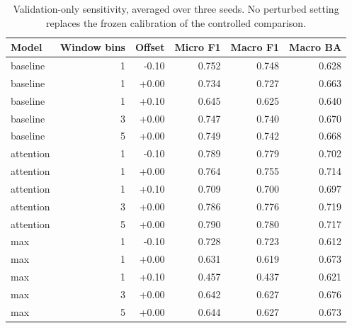 \begin{table}[H]\centering\small
\caption{Validation-only sensitivity, averaged over three seeds. No perturbed setting replaces the frozen calibration of the controlled comparison.}
\begin{tabular}{lrrrrr}\toprule
Model & Window bins & Offset & Micro F1 & Macro F1 & Macro BA \\\midrule
baseline & 1 & -0.10 & 0.752 & 0.748 & 0.628 \\
baseline & 1 & +0.00 & 0.734 & 0.727 & 0.663 \\
baseline & 1 & +0.10 & 0.645 & 0.625 & 0.640 \\
baseline & 3 & +0.00 & 0.747 & 0.740 & 0.670 \\
baseline & 5 & +0.00 & 0.749 & 0.742 & 0.668 \\
attention & 1 & -0.10 & 0.789 & 0.779 & 0.702 \\
attention & 1 & +0.00 & 0.764 & 0.755 & 0.714 \\
attention & 1 & +0.10 & 0.709 & 0.700 & 0.697 \\
attention & 3 & +0.00 & 0.786 & 0.776 & 0.719 \\
attention & 5 & +0.00 & 0.790 & 0.780 & 0.717 \\
max & 1 & -0.10 & 0.728 & 0.723 & 0.612 \\
max & 1 & +0.00 & 0.631 & 0.619 & 0.673 \\
max & 1 & +0.10 & 0.457 & 0.437 & 0.621 \\
max & 3 & +0.00 & 0.642 & 0.627 & 0.676 \\
max & 5 & +0.00 & 0.644 & 0.627 & 0.673 \\
\bottomrule\end{tabular}\end{table}